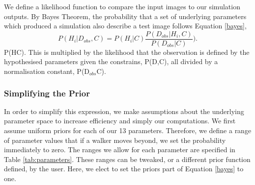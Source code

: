 We define a likelihood function to compare the input images to our simulation outputs. By Bayes Theorem, the probability that a set of underlying parameters which produced a simulation also describe a test image follows Equation \ref{bayes},
\begin{equation}\label{bayes}
P(H_{i}|D_{obs},C) = P(H_{i}|C)\frac{P(D_{obs}|H_{i},C)}{P(D_{obs}|C)}).
\end{equation}
P(H\DIFdelbegin {}\DIFdelend \DIFaddbegin {}\DIFaddend C). This is multiplied by the likelihood that the observation is defined by the hypothesised parameters given the constrains, P(D\DIFdelbegin {}\DIFdelend \DIFaddbegin {}\DIFaddend ,C), all divided by a normalisation constant, P(D$_{obs}$\DIFdelbegin \DIFdel{|}\DIFdelend \DIFaddbegin \DIFadd{$|$}\DIFaddend C).

\subsubsection{Simplifying the Prior}
In order to simplify this expression, we make assumptions about the underlying parameter space to increase efficiency and simply our computations. We first assume uniform priors for each of our 13 parameters. Therefore, we define a range of parameter values that if a walker moves beyond, we set the probability immediately to zero. The ranges we allow for each parameter are specified in Table \ref{tab:parameters}. These ranges can be tweaked, or a different prior function defined, by the user. Here, we elect to set the priors part of Equation \ref{bayes} to one.

